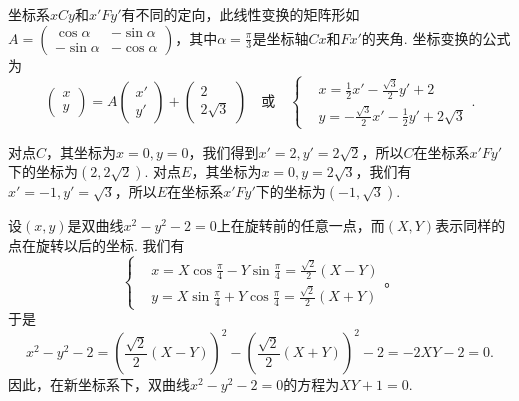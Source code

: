 \begin{solution}
  \begin{inparaenum}[(a)]
    \item 坐标系$xCy$和$x'Fy'$有不同的定向，此线性变换的矩阵形如$A=\begin{pmatrix}
          \cos\alpha & -\sin\alpha \\
          -\sin\alpha & -\cos\alpha
        \end{pmatrix}$，其中$\alpha=\frac\pi3$是坐标轴$Cx$和$Fx'$的夹角. 坐标变换的公式为
        \[
          \begin{pmatrix}
            x \\
            y
          \end{pmatrix} = A
          \begin{pmatrix}
            x' \\
            y'
          \end{pmatrix} +
          \begin{pmatrix}
            2 \\
            2\sqrt3
          \end{pmatrix} \quad \text{或} \quad
          \left\{
            \begin{aligned}
              & x = \frac12x' - \frac{\sqrt3}2y' + 2 \\
              & y = -\frac{\sqrt3}2x' - \frac12y' + 2\sqrt3
            \end{aligned}
          \right..
        \]

    \item 对点$C$，其坐标为$x=0,y=0$，我们得到$x'=2,y'=2\sqrt2$，所以$C$在坐标系$x'Fy'$下的坐标为$(2,2\sqrt2)$. 对点$E$，其坐标为$x=0,y=2\sqrt3$，我们有$x'=-1,y'=\sqrt3$，所以$E$在坐标系$x'Fy'$下的坐标为$(-1,\sqrt3)$.
  \end{inparaenum}
\end{solution}

\begin{solution}
  设$(x,y)$是双曲线$x^2-y^2-2=0$上在旋转前的任意一点，而$(X,Y)$表示同样的点在旋转以后的坐标. 我们有
  \[
    \left\{
      \begin{aligned}
        & x = X\cos\frac\pi4 - Y\sin\frac\pi4 = \frac{\sqrt2}2(X - Y) \\
        & y = X\sin\frac\pi4 + Y\cos\frac\pi4 = \frac{\sqrt2}2(X + Y)
      \end{aligned}
    \right.。
  \]
  于是
  \[
    x^2 - y^2 - 2 = \left( \frac{\sqrt2}2(X - Y) \right)^2 - \left( \frac{\sqrt2}2(X + Y) \right)^2 - 2 = -2XY - 2 = 0.
  \]
  因此，在新坐标系下，双曲线$x^2-y^2-2=0$的方程为$XY+1=0$.
\end{solution}


